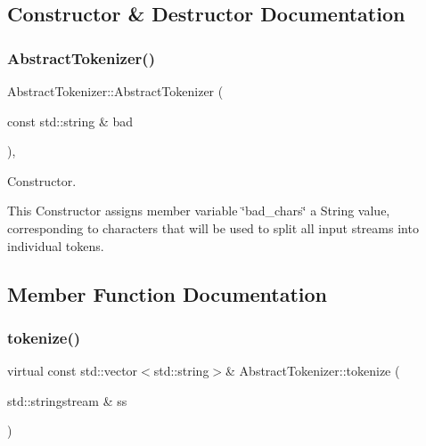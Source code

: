 \subsection{Constructor \& Destructor Documentation}
\mbox{\label{class_abstract_tokenizer_aef53a337d291e7ae1553511419d31190}} 
\subsubsection{\texorpdfstring{Abstract\+Tokenizer()}{AbstractTokenizer()}}
{\footnotesize\ttfamily Abstract\+Tokenizer\+::\+Abstract\+Tokenizer (\begin{DoxyParamCaption}\item[{const std\+::string \&}]{bad }\end{DoxyParamCaption})\hspace{0.3cm}{\ttfamily [inline]}, {\ttfamily [explicit]}}



Constructor. 

This Constructor assigns member variable \char`\"{}bad\+\_\+chars\char`\"{} a String value, corresponding to characters that will be used to split all input streams into individual tokens. 

\subsection{Member Function Documentation}
\mbox{\label{class_abstract_tokenizer_a566f425fc415ed1dfefc13706868a3ff}} 
\subsubsection{\texorpdfstring{tokenize()}{tokenize()}}
{\footnotesize\ttfamily virtual const std\+::vector$<$std\+::string$>$\& Abstract\+Tokenizer\+::tokenize (\begin{DoxyParamCaption}\item[{std\+::stringstream \&}]{ss }\end{DoxyParamCaption})\hspace{0.3cm}{\ttfamily [pure virtual]}}



